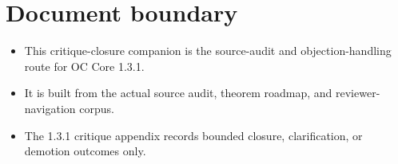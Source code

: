 \section*{Document boundary}
\begin{itemize}[leftmargin=*]
\item This critique-closure companion is the source-audit and objection-handling route for OC Core 1.3.1.
\item It is built from the actual source audit, theorem roadmap, and reviewer-navigation corpus.
\item The 1.3.1 critique appendix records bounded closure, clarification, or demotion outcomes only.
\end{itemize}
